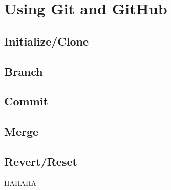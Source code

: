\documentclass{beamer}
\begin{document}
	\section{Using Git and GitHub}
		\subsection{Initialize/Clone}

		\subsection{Branch}

		\subsection{Commit}

		\subsection{Merge}

		\subsection{Revert/Reset}

	HAHAHA
\end{document}
